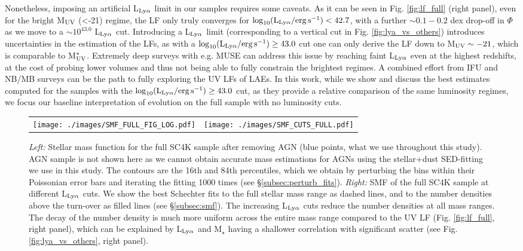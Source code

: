 \documentclass[a4paper,fleqn,usenatbib]{mnras}
\begin{document}
Nonetheless, imposing an artificial L$_{\rm Ly\alpha}$ limit in our samples requires some caveats. As it can be seen in Fig. \ref{fig:lf_full} (right panel), even for the bright M$_{\rm UV}$ (<-21) regime, the LF only truly converges for $\log_{10} (\rm L_{Ly\alpha}/erg\,s^{-1}) < 42.7$, with a further $\sim0.1-0.2$ dex drop-off in $\Phi$ as we move to a $\sim10^{43.0}$ L$_{\rm Ly\alpha}$ cut. Introducing a L$_{\rm Ly\alpha}$ limit (corresponding to a vertical cut in Fig. \ref{fig:lya_vs_others}) introduces uncertainties in the estimation of the LFs, as with a $\log_{10} (\rm L_{Ly\alpha}/erg\,s^{-1}) \geq 43.0$ cut one can only derive the LF down to M$_{\rm UV}\sim-21$, which is comparable to M$_{\rm UV}^*$. Extremely deep surveys with e.g. MUSE can address this issue by reaching faint L$_{\rm Ly\alpha}$ even at the highest redshifts, at the cost of probing lower volumes and thus not being able to fully constrain the brightest regimes. A combined effort from IFU and NB/MB surveys \citep[see synergy/combined Ly$\alpha$ LF,][]{Sobral2018} can be the path to fully exploring the UV LFs of LAEs. In this work, while we show and discuss the best estimates computed for the samples with the $\log_{10} (\rm L_{Ly\alpha}/erg\,s^{-1}) \geq 43.0$ cut, as they provide a relative comparison of the same luminosity regimes, we focus our baseline interpretation of evolution on the full sample with no luminosity cuts.

%
%
\begin{figure*}
\begin{tabular}{ll}
\centering
  \texttt{[image: ./images/SMF\_FULL\_FIG\_LOG.pdf]}
  &
  \texttt{[image: ./images/SMF\_CUTS\_FULL.pdf]}  
\end{tabular}
  \caption{{\it Left:} Stellar mass function for the full SC4K sample after removing AGN (blue points, what we use throughout this study). AGN sample is not shown here as we cannot obtain accurate mass estimations for AGNs using the stellar+dust SED-fitting we use in this study. The contours are the 16th and 84th percentiles, which we obtain by perturbing the bins within their Poissonian error bars and iterating the fitting 1000 times (see \S\ref{subsec:perturb_fits}). {\it Right:} SMF of the full SC4K sample at different L$_{\rm Ly\alpha}$ cuts. We show the best Schechter fits to the full stellar mass range as dashed lines, and to the number densities above the turn-over as filled lines (see \S\ref{subsec:smf}). The increasing L$_{\rm Ly\alpha}$ cuts reduce the number densities at all mass ranges. The decay of the number density is much more uniform across the entire mass range compared to the UV LF (Fig. \ref{fig:lf_full}, right panel), which can be explained by L$_{\rm Ly\alpha}$ and M$_\star$ having a shallower correlation with significant scatter (see Fig. \ref{fig:lya_vs_others}, right panel).}
  \label{fig:smf_full}
\end{figure*}
\end{document}
